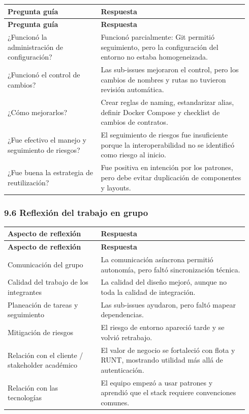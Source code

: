 \documentclass[11pt,a4paper]{article}
\begin{document}
\begingroup
\small
\setlength{\tabcolsep}{3pt}
\begin{longtable}{P{0.36\linewidth}P{0.58\linewidth}}
\toprule
\textbf{Pregunta guía} & \textbf{Respuesta} \\
\midrule
\endfirsthead
\toprule
\textbf{Pregunta guía} & \textbf{Respuesta} \\
\midrule
\endhead
\bottomrule
\endlastfoot
¿Funcionó la administración de configuración? & Funcionó parcialmente: Git permitió seguimiento, pero la configuración del entorno no estaba homogeneizada. \\
¿Funcionó el control de cambios? & Las sub-issues mejoraron el control, pero los cambios de nombres y rutas no tuvieron revisión automática. \\
¿Cómo mejorarlos? & Crear reglas de naming, estandarizar alias, definir Docker Compose y checklist de cambios de contratos. \\
¿Fue efectivo el manejo y seguimiento de riesgos? & El seguimiento de riesgos fue insuficiente porque la interoperabilidad no se identificó como riesgo al inicio. \\
¿Fue buena la estrategia de reutilización? & Fue positiva en intención por los patrones, pero debe evitar duplicación de componentes y layouts. \\
\end{longtable}
\endgroup

\subsubsection{9.6 Reflexión del trabajo en grupo}

\begingroup
\small
\setlength{\tabcolsep}{3pt}
\begin{longtable}{P{0.36\linewidth}P{0.58\linewidth}}
\toprule
\textbf{Aspecto de reflexión} & \textbf{Respuesta} \\
\midrule
\endfirsthead
\toprule
\textbf{Aspecto de reflexión} & \textbf{Respuesta} \\
\midrule
\endhead
\bottomrule
\endlastfoot
Comunicación del grupo & La comunicación asíncrona permitió autonomía, pero faltó sincronización técnica. \\
Calidad del trabajo de los integrantes & La calidad del diseño mejoró, aunque no toda la calidad de integración. \\
Planeación de tareas y seguimiento & Las sub-issues ayudaron, pero faltó mapear dependencias. \\
Mitigación de riesgos & El riesgo de entorno apareció tarde y se volvió retrabajo. \\
Relación con el cliente / stakeholder académico & El valor de negocio se fortaleció con flota y RUNT, mostrando utilidad más allá de autenticación. \\
Relación con las tecnologías & El equipo empezó a usar patrones y aprendió que el stack requiere convenciones comunes. \\
\end{longtable}
\endgroup
\end{document}
